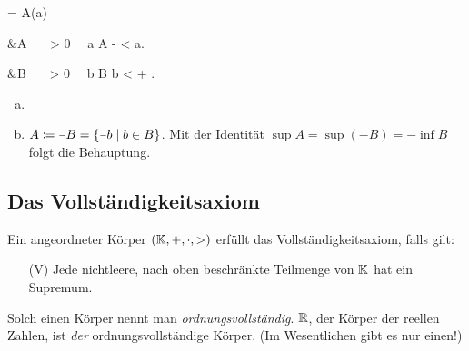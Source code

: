 \documentclass[../ana1.tex]{subfiles}
\begin{document}
\begin{lem}\label{satz:epskrit_inf_sup}\leavevmode
		\begin{alignenum}{\alpha = \sup A}{(a)}
			\begin{aitem}
				 &\iff \alpha \geq A  \, \wedge  \, \forall \, \varepsilon > 0  \, \exists \, a \in A \colon \; \alpha - \varepsilon < a.
			\end{aitem}\begin{aitem}
				 &\iff \beta  \leq B  \, \wedge  \, \forall \, \varepsilon > 0  \, \exists \, b \in B \colon \; b < \beta + \varepsilon.
			\end{aitem}
		\end{alignenum}
\end{lem}
\begin{bew}\leavevmode
	\begin{enumerate}[(a)]
		\item {}
		\item \(A \coloneqq \minus B = \set{\minus b  \;\vert  \;b \in B} \). Mit der Identität
			  \(\sup A = \sup(\minus B) = \minus \inf B \) folgt die Behauptung.\qedhere
	\end{enumerate}
\end{bew}


\subsection{Das Vollständigkeitsaxiom}

\begin{defi}
	Ein angeordneter Körper \((\mathbb{K} , + , \cdot , >) \) erfüllt das Voll\-ständig\-keits\-axiom, falls gilt:
	\begin{enumerate}
		\item[(V)]\label{ax:V}Jede nichtleere, nach oben beschränkte Teilmenge von \(\mathbb{K} \) hat ein Supremum.
	\end{enumerate}
	Solch einen Körper nennt man \textit{ordnungsvollständig}. \(\mathbb{R} \), der Körper der reellen Zahlen, ist \textit{der} ordnungsvollständige Körper. (Im Wesentlichen gibt es nur einen!)
\end{defi}
\end{document}

